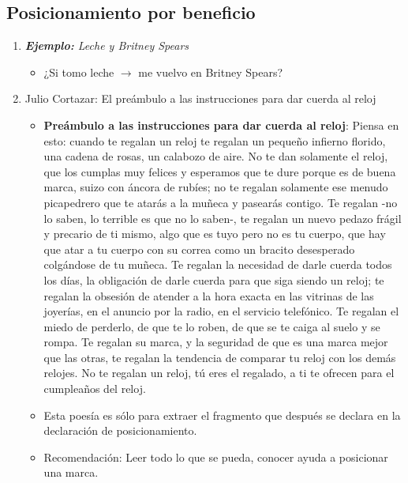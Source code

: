 \subsection{Posicionamiento por beneficio}  
\begin{enumerate}
    \item \emph{\textbf{Ejemplo: }Leche y Britney Spears}   
        \begin{itemize}
            \item ¿Si tomo leche $\rightarrow$ me vuelvo en Britney Spears? 
        \end{itemize}
    
    \item Julio Cortazar: El preámbulo a las instrucciones para dar cuerda al reloj
        \begin{itemize}
            \item \textbf{Preámbulo a las instrucciones para dar cuerda al reloj}: \newline 
            Piensa en esto: cuando te regalan un reloj te regalan un pequeño infierno florido, una cadena de rosas, un calabozo de aire. No te dan solamente el reloj, que los cumplas muy felices y esperamos que te dure porque es de buena marca, suizo con áncora de rubíes; no te regalan solamente ese menudo picapedrero que te atarás a la muñeca y pasearás contigo. Te regalan -no lo saben, lo terrible es que no lo saben-, te regalan un nuevo pedazo frágil y precario de ti mismo, algo que es tuyo pero no es tu cuerpo, que hay que atar a tu cuerpo con su correa como un bracito desesperado colgándose de tu muñeca. Te regalan la necesidad de darle cuerda todos los días, la obligación de darle cuerda para que siga siendo un reloj; te regalan la obsesión de atender a la hora exacta en las vitrinas de las joyerías, en el anuncio por la radio, en el servicio telefónico. Te regalan el miedo de perderlo, de que te lo roben, de que se te caiga al suelo y se rompa. Te regalan su marca, y la seguridad de que es una marca mejor que las otras, te regalan la tendencia de comparar tu reloj con los demás relojes. No te regalan un reloj, tú eres el regalado, a ti te ofrecen para el cumpleaños del reloj.            
        \end{itemize}
        \begin{itemize}[label=\#]
            \item Esta poesía es sólo para extraer el fragmento que después se declara en la declaración de posicionamiento.
            \item Recomendación: Leer todo lo que se pueda, conocer ayuda a posicionar una marca.
        \end{itemize}
    

\end{enumerate}
